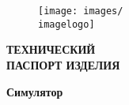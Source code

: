\fancyhead{}

\ifIsLngRus  %
{
    \begin{figure}[h]
        \texttt{[image: images/\\imagelogo]}
    \end{figure}

    \vspace*{\fill}

    \noindent
    \Huge\textbf{\textcolor{TradeMarkNameOneColor}{
        ТЕХНИЧЕСКИЙ\\ 
        ПАСПОРТ ИЗДЕЛИЯ
    }}\par
    
    \vspace*{\fill}
    \vspace*{\fill}
    
    \begin{flushleft}
        
        \noindent                   
        \Large\textbf{\textcolor{TradeMarkNameOneColor}{
            Симулятор~\producttype        
        }}\par
    
        \vspace*{\fill}
    
        \noindent         
        \Large\textbf{\textcolor{clColontitulText}{
            \productname        
        }}\par
                 
    \end{flushleft}
         
    \vspace*{\fill}
    \begin{flushright}
        \producttrademarknametitul
    \end{flushright}
    \vspace*{\fill}

}
